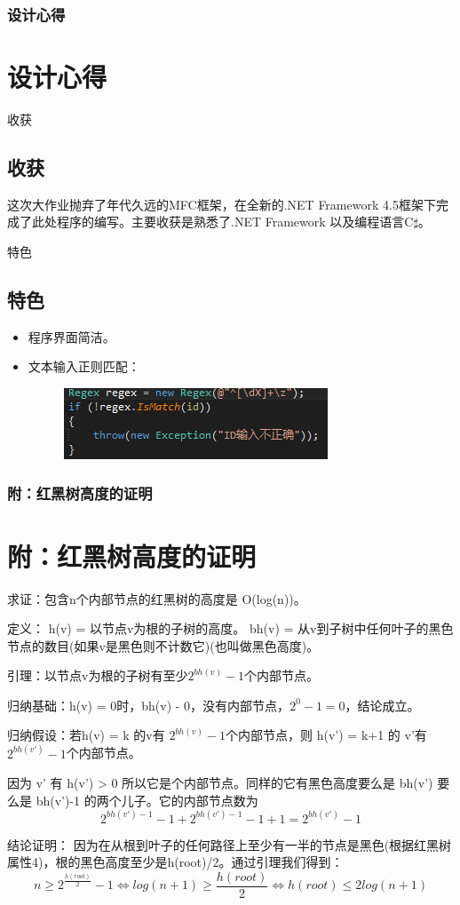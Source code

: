 \documentclass{beamer}
\begin{document}
\begin{frame}
\frametitle{设计心得}
\section{设计心得}
\begin{block}{收获}
\subsection{收获}
这次大作业抛弃了年代久远的MFC框架，在全新的.NET Framework 4.5框架下完成了此处程序的编写。主要收获是熟悉了.NET Framework 以及编程语言C$\sharp$。
\end{block}
\begin{block}{特色}
\subsection{特色}
\begin{itemize}
\item 程序界面简洁。
\item 文本输入正则匹配：
\begin{figure}[H]
\centering
\includegraphics[scale = 0.8]{6.png}
\end{figure}
\end{itemize}
\end{block}
\end{frame}

\begin{frame}
\frametitle{附：红黑树高度的证明}
\section{附：红黑树高度的证明}
求证：包含n个内部节点的红黑树的高度是 O(log(n))。\par
定义：
h(v) = 以节点v为根的子树的高度。
bh(v) = 从v到子树中任何叶子的黑色节点的数目(如果v是黑色则不计数它)(也叫做黑色高度)。\par
\end{frame}
\begin{frame}
引理：以节点v为根的子树有至少$2^{bh(v) }− 1$个内部节点。\par
归纳基础：h(v) = 0时，bh(v) - 0，没有内部节点，$2^0-1=0$，结论成立。\par
归纳假设：若h(v) = k 的v有 $2^{bh(v)} − 1 $个内部节点，则 h(v') = k+1 的 v'有$2^{bh(v')}− 1 $个内部节点。\par
因为 v' 有 h(v') > 0 所以它是个内部节点。同样的它有黑色高度要么是 bh(v') 要么是 bh(v')-1 的两个儿子。它的内部节点数为
\[2^{bh(v') − 1} − 1 + 2^{bh(v') − 1} − 1 + 1 = 2^{bh(v')} − 1\]\par
结论证明：
因为在从根到叶子的任何路径上至少有一半的节点是黑色(根据红黑树属性4)，根的黑色高度至少是h(root)/2。通过引理我们得到：
\[
n\geq 2^{\frac{h(root)}{2}}-1 \Leftrightarrow log(n+1) \geq \frac{h(root)}{2} \Leftrightarrow h(root)\leq 2log(n+1)
\]
\end{frame}
\end{document}

